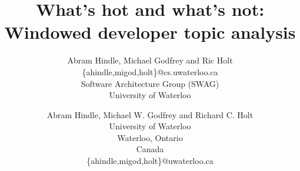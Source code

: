 \documentclass[times, 10pt,twocolumn]{article}
\author{Abram Hindle, Michael Godfrey and Ric Holt \\
\{ahindle,migod,holt\}@cs.uwaterloo.ca\\
Software Architecture Group (SWAG)\\
University of Waterloo\\
}
\title{What's hot and what's not:\\Windowed developer topic analysis}
\begin{document}
\newcommand{\affaddr}[1]{#1}
\newcommand{\aemail}[1]{#1}
\author{
Abram Hindle, Michael W. Godfrey and Richard C. Holt\\
\affaddr{University of Waterloo}\\
\affaddr{Waterloo, Ontario}\\
\affaddr{Canada}\\
\aemail{\{ahindle,migod,holt\}@uwaterloo.ca}
}






\maketitle
\thispagestyle{empty}
\end{document}

